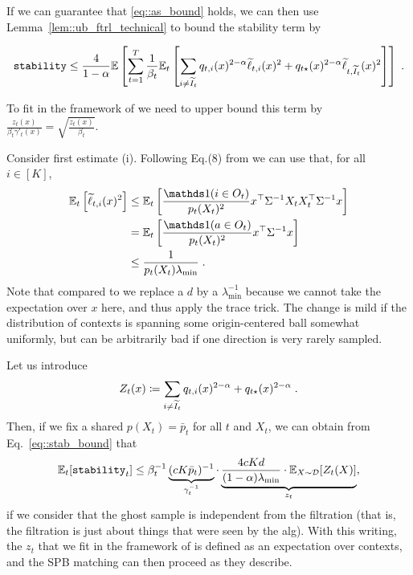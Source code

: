 If we can guarantee that \eqref{eq::as_bound} holds, we can then use Lemma~\ref{lem::ub_ftrl_technical} to bound the stability term by 

\begin{equation}\label{eq::stab_bound}
	\texttt{stability}\leq \frac{4}{1-\alpha} \mathbb{E}\left[\sum_{t=1}^T  \frac{1}{\beta_t} \mathbb{E}_t\left[ \sum_{i \neq \widetilde{I}_t} q_{t,i}(x)^{2-\alpha} \widetilde{\ell}_{t,i}(x)^2 + q_{t\star}(x)^{2-\alpha} \widetilde{\ell}_{t,\widetilde{I}_t}(x)^2 \right] \right]\;. 
	\end{equation}

To fit in the framework of \cite{BOBWhardproblems} we need to upper bound this term by $\frac{z_t(x)}{\beta_t \gamma'_t(x)}=\sqrt{\frac{z_t(x)}{\beta_t}}$.

Consider first estimate (i). Following Eq.\;(8) from \cite{NeuO20} we can use that, for all $i \in [K]$,  
\begin{align*}
\bE_t\left[\wt \ell_{t,i}(x)^2\right]&\leq\bE_t\left[\frac{\ind(i\in O_t)}{p_t(X_t)^2} x^\top\Sigma^{-1}X_tX_t^\top\Sigma^{-1}x\right] \\
& = \bE_t\left[\frac{\ind(a\in O_t)}{p_t(X_t)^2} x^\top\Sigma^{-1}x \right] \\
& \leq \frac{1}{p_t(X_t)\lambda_{\min}} \;.
\end{align*}
Note that compared to \cite{NeuO20} we replace a $d$ by a $\lambda_{\min}^{-1}$ because we cannot take the expectation over $x$ here, and thus apply the trace trick. The change is mild if the distribution of contexts is spanning some origin-centered ball somewhat uniformly, but can be arbitrarily bad if one direction is very rarely sampled.
 

Let us introduce 
\[Z_t(x)\coloneqq   \sum_{i \neq \widetilde{I}_t} q_{t,i}(x)^{2-\alpha} + q_{t\star}(x)^{2-\alpha}\;. \]
Then, if we fix a shared $p(X_t)=\bar p_t$ for all $t$ and $X_t$, we can obtain from Eq.~\eqref{eq::stab_bound} that 
\[\mathbb{E}_t[\texttt{stability}_t] \leq \beta_t^{-1} \underbrace{(cK \bar p_t)^{-1}}_{\gamma_t^{-1}} \cdot  \underbrace{\frac{4cKd}{(1-\alpha)\lambda_{\min}}\cdot \mathbb{E}_{X\sim \mathcal{D}}[Z_t(X)]}_{z_t} , \] 
if we consider that the ghost sample is independent from the filtration (that is, the filtration is just about things that were seen by the alg). With this writing, the $z_t$ that we fit in the framework of \cite{BOBWhardproblems} is defined as an expectation over contexts, and the SPB matching can then proceed as they describe. 

